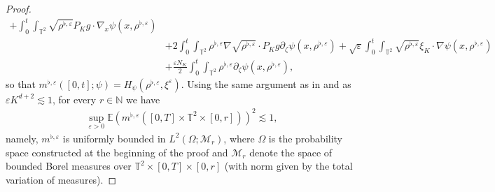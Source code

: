 \begin{proof}
\begin{align}
+\int_{0}^{t} \int_{\mathbb{T}^2}\sqrt{\rho^{\flat,\varepsilon}}P_{K}g\cdot\nabla_x\psi(x, \rho^{\flat,\varepsilon})\nonumber\\
&+2\int_{0}^{t} \int_{\mathbb{T}^2} \rho^{\flat,\varepsilon}\nabla \sqrt{\rho^{\flat,\varepsilon}}\cdot P_{K}g \partial_\zeta\psi(x, \rho^{\flat,\varepsilon})+\sqrt{\varepsilon}\int_{0}^{t} \int_{\mathbb{T}^2} \sqrt{\rho^{\flat,\varepsilon}} \xi_{K}\cdot \nabla \psi(x,\rho^{\flat,\varepsilon})\nonumber\\
&+\frac{\varepsilon N_K}{2}\int_{0}^{t} \int_{\mathbb{T}^2} \rho^{\flat,\varepsilon} \partial_{\zeta} \psi(x, \rho^{\flat,\varepsilon}),
\end{align}
so that $m^{\flat,\varepsilon}([0,t];\psi) = H_{\psi}(\rho^{\flat,\varepsilon},\xi^{\varepsilon})$. Using the same argument as in \cite[Theorem 6.2]{WZ22} and as $\varepsilon K^{d+2}\lesssim 1$, for every $r\in\mathbb{N}$ we have
\begin{align}\label{MC L1 KE'}	
\sup_{\varepsilon > 0}\mathbb{E}\left(m^{\flat,\varepsilon}([0,T]\times\mathbb{T}^2\times[0,r])\right)^2 \lesssim 1, 
\end{align}
namely, $m^{\flat,\varepsilon}$ is uniformly bounded in $L^2(\Omega; \mathcal{M}_r)$, where $\Omega$ is the probability space constructed at the beginning of the proof and $\mathcal{M}_r$ denote the space of bounded Borel measures over $\mathbb{T}^2\times [0,T]\times [0,r]$ (with norm given by the total variation of measures). 


\end{proof}
